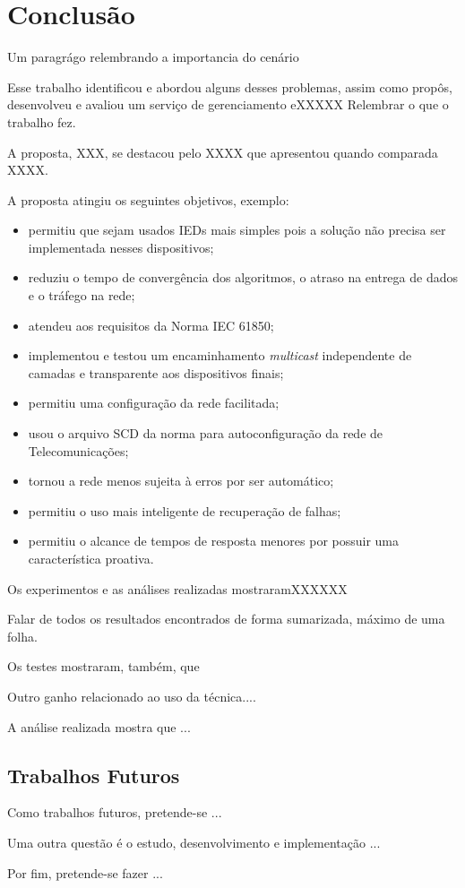\chapter{Conclusão} \label{cap:conc}

Um paragrágo relembrando a importancia do cenário

Esse trabalho identificou e abordou alguns desses problemas, assim como propôs, desenvolveu e avaliou um serviço de gerenciamento eXXXXX
Relembrar o que o trabalho fez.


A proposta, XXX,  se destacou pelo XXXX que apresentou quando comparada XXXX. 

A proposta atingiu os seguintes objetivos, exemplo:
\begin{itemize}
\item permitiu que sejam usados IEDs mais simples pois a solução não precisa ser implementada nesses dispositivos;
\item reduziu o tempo de convergência dos algoritmos, o atraso na entrega de dados e o tráfego na rede;
\item atendeu aos requisitos da Norma IEC 61850;
\item implementou e testou um encaminhamento \textit{multicast} independente de camadas e transparente aos dispositivos finais;
\item permitiu uma configuração da rede facilitada;
\item usou o arquivo SCD da norma para autoconfiguração da rede de Telecomunicações;
\item tornou a rede menos sujeita à erros por ser automático;
\item permitiu o uso mais inteligente de recuperação de falhas;
\item permitiu o alcance de tempos de resposta menores por possuir uma característica proativa.
\end{itemize}

Os experimentos e as análises realizadas mostraramXXXXXX

Falar de todos os resultados encontrados de forma sumarizada, máximo de uma folha.

Os testes mostraram, também, que 


Outro ganho relacionado ao uso da técnica....

A análise realizada mostra que ...

\section{Trabalhos Futuros}\label{sec:8_trabfut}

Como trabalhos futuros, pretende-se ...

Uma outra questão é o estudo, desenvolvimento e implementação ...

Por fim, pretende-se fazer ...